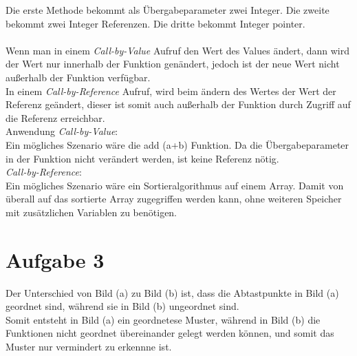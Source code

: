 \documentclass[12pt]{article}
\begin{document}
\begin{enumerate}[a)]
\begin{lstlisting}
\end{lstlisting}  
Die erste Methode bekommt als Übergabeparameter zwei Integer. Die zweite bekommt zwei Integer Referenzen. Die dritte bekommt Integer pointer.\\
\\
Wenn man in einem \emph{Call-by-Value} Aufruf den Wert des Values \"andert, dann wird der Wert nur innerhalb der Funktion gen\"andert, jedoch ist der neue Wert nicht au{\ss}erhalb der Funktion verf\"ugbar.\\
In einem \emph{Call-by-Reference} Aufruf, wird beim \"andern des Wertes der Wert der Referenz ge\"andert, dieser ist somit auch au{\ss}erhalb der Funktion durch Zugriff auf die Referenz erreichbar.\\
Anwendung \emph{Call-by-Value}:\\
Ein mögliches Szenario wäre die add (a+b) Funktion. Da die Übergabeparameter in der Funktion nicht verändert werden, ist keine Referenz nötig.\\
\emph{Call-by-Reference}:\\
Ein mögliches Szenario wäre ein Sortieralgorithmus auf einem Array. Damit von überall auf das sortierte Array zugegriffen werden kann, ohne weiteren Speicher mit zusätzlichen Variablen zu benötigen.
\end{enumerate}

\section*{Aufgabe 3}
Der Unterschied von Bild (a) zu Bild (b) ist, dass die Abtastpunkte in Bild (a) geordnet sind, w\"ahrend sie in Bild (b) ungeordnet sind.\\
Somit entsteht in Bild (a) ein geordnetese Muster, w\"ahrend in Bild (b) die Funktionen nicht geordnet \"ubereinander gelegt werden k\"onnen, und somit das Muster nur vermindert zu erkennne ist. 
\end{document}

